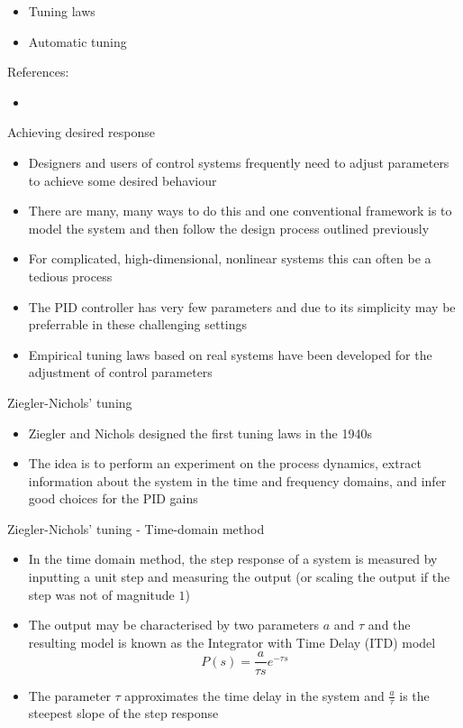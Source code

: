 \documentclass{beamer-control}
\begin{document}

\begin{SUMMARY}
\begin{itemize}
\item Tuning laws
\item Automatic tuning
\end{itemize}
\vfill References:
\begin{itemize}
\item {}
\end{itemize}
\end{SUMMARY}




\begin{frame}{Achieving desired response}
	\begin{itemize}
		\item Designers and users of control systems frequently need to adjust parameters to achieve some desired behaviour
		\item There are many, many ways to do this and one conventional framework is to model the system and then follow the design process outlined previously
		\item For complicated, high-dimensional, nonlinear systems this can often be a tedious process
		\item The PID controller has very few parameters and due to its simplicity may be preferrable in these challenging settings
		\item Empirical tuning laws based on real systems have been developed for the adjustment of control parameters
	\end{itemize}
\end{frame}

\begin{frame}{Ziegler-Nichols' tuning}
\begin{itemize}
\item Ziegler and Nichols designed the first tuning laws in the 1940s
\item The idea is to perform an experiment on the process dynamics, extract information about the system in the time and frequency domains, and infer good choices for the PID gains
\end{itemize}
\end{frame}


\begin{frame}{Ziegler-Nichols' tuning - Time-domain method}
\begin{itemize}
	\item In the time domain method, the step response of a system is measured by inputting a unit step and measuring the output (or scaling the output if the step was not of magnitude $1$)
	\item The output may be characterised by two parameters $a$ and $\tau$ and the resulting model is known as the Integrator with Time Delay (ITD) model
	\[P(s) = \frac{a}{\tau s}e^{-\tau s}\]
	\item The parameter $\tau$ approximates the time delay in the system and $\tfrac{a}{\tau}$ is the steepest slope of the step response
\end{itemize}
\end{frame}
\end{document}

